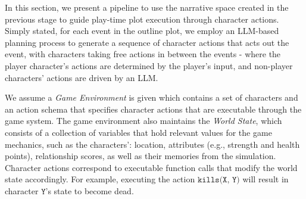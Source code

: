 







In this section, we present a pipeline to use the narrative space created in the previous stage to guide play-time plot execution through character actions. Simply stated, for each event in the outline plot, we employ an LLM-based  planning process to generate a sequence of character actions that acts out the event, with characters taking free actions in between the events - where the player character's actions are determined by the player's input, and non-player characters' actions are driven by an LLM.

We assume a {\em Game Environment} is given which contains a set of characters and an action schema that specifies character actions that are executable through the game system. The game environment also maintains the {\em World State}, which consists of a collection of variables that hold relevant values for the game mechanics, such as the characters’: location, attributes (e.g., strength and health points), relationship scores, as well as their memories from the simulation. Character actions correspond to executable function calls that modify the world state accordingly. For example, executing the action $\texttt{kills(X, Y)}$ will result in character $\texttt{Y}$'s state to become dead.

